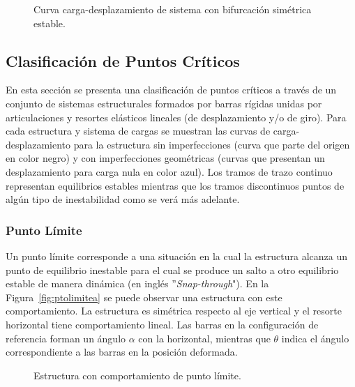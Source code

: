 \begin{figure}[htb]
	\centering
\def\svgwidth{0.8\textwidth}

	\caption{Curva carga-desplazamiento de sistema con bifurcación simétrica estable.}
	\label{fig:fig8}
\end{figure}

\subsection{Clasificación de Puntos Críticos}

En esta sección se presenta una clasificación de puntos críticos a través de un conjunto de sistemas estructurales formados por barras rígidas unidas por articulaciones y resortes elásticos lineales (de desplazamiento y/o de giro). %
%
%
Para cada estructura y sistema de cargas se muestran las curvas de carga-desplazamiento para la estructura sin imperfecciones (curva que parte del origen en color negro) y con imperfecciones geométricas (curvas que presentan un desplazamiento para carga nula en color azul). %
%
Los tramos de trazo continuo representan equilibrios estables mientras que los tramos discontinuos puntos de algún tipo de inestabilidad como se verá más adelante.


\subsubsection{Punto Límite}\label{MisesTruss}

Un punto límite corresponde a una situación en la cual la estructura alcanza un punto de equilibrio inestable para el cual se produce un salto a otro equilibrio estable de manera dinámica (en inglés ''\textit{Snap-through}"). %
%
En la Figura~\ref{fig:ptolimitea} se puede observar una estructura con este comportamiento. %
%
La estructura es simétrica respecto al eje vertical y el resorte horizontal tiene comportamiento lineal. %
%
Las barras en la configuración de referencia forman un ángulo $\alpha$ con la horizontal, mientras que $\theta$ indica el ángulo correspondiente a las barras en la posición deformada.

\begin{figure}[htb]
	\centering
%
	\caption{Estructura con comportamiento de punto límite.}
	\label{fig:fig9}
\end{figure}


